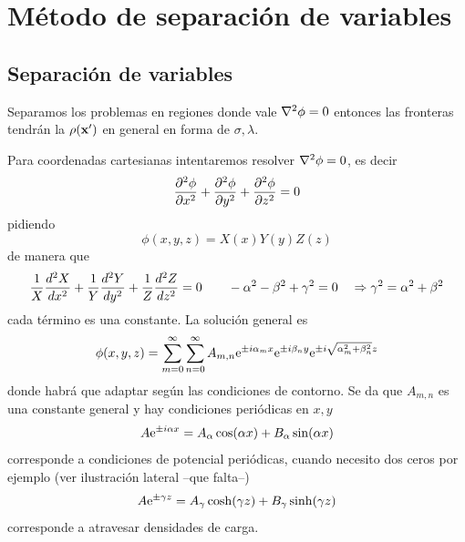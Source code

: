 \documentclass[10pt,oneside]{CBFT_book}
\begin{document}
\chapter{Método de separación de variables}

\section{Separación de variables}

Separamos los problemas en regiones donde vale $\lapm{\phi} = 0$ entonces las fronteras tendrán la
$\rho(\vb{x}')$ en general en forma de $\sigma,\lambda$.

Para coordenadas cartesianas intentaremos resolver $\lapm{\phi} = 0$, es decir
\[
	\dpar[2]{\phi}{x} + \dpar[2]{\phi}{y}  + \dpar[2]{\phi}{z}  = 0
\]
pidiendo
\[
	\phi(x,y,z) = X(x)Y(y)Z(z)
\]
de manera que 
\[
	\frac{1}{X}\dtot[2]{X}{x} + \frac{1}{Y}\dtot[2]{Y}{y} + \frac{1}{Z}\dtot[2]{Z}{z} = 0 \qquad 
	- \alpha^2  - \beta^2 + \gamma^2 = 0 \quad \Rightarrow  \gamma^2 = \alpha^2 + \beta^2 
\]
cada término es una constante. La solución general es
\[
	\phi(x,y,z) = \sum_{m=0}^\infty \sum_{n=0}^\infty A_{m,n} \euler^{\pm i\alpha_m x}
	\euler^{\pm i\beta_n y} \euler^{\pm i\sqrt{\alpha_m^2 + \beta_n^2 }z}
\]
donde habrá que adaptar según las condiciones de contorno. Se da que $A_{m,n}$ es una constante general
y hay condiciones periódicas en $x,y$
\[
	A\euler^{\pm i\alpha x} = A_\alpha \cos(\alpha x) + B_\alpha \sin(\alpha x)
\]
corresponde a condiciones de potencial periódicas, cuando necesito dos ceros por ejemplo (ver ilustración
lateral --que falta--)
\[
	A\euler^{\pm \gamma z} = A_\gamma \cosh(\gamma z) + B_\gamma \sinh(\gamma z)
\]
corresponde a atravesar densidades de carga.
\end{document}
